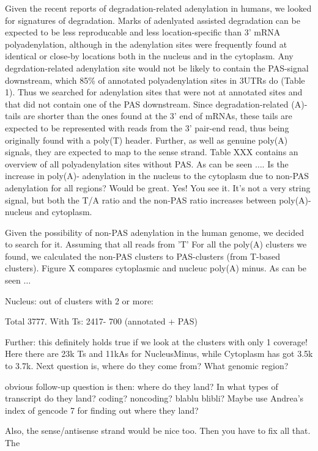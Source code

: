 \documentclass[a4paper]{article}
\begin{document}
Given the recent reports of degradation-related adenylation in humans, we
looked for signatures of degradation. Marks of adenlyated assisted degradation
can be expected to be less reproducable and less location-specific than 3' mRNA
polyadenylation, although in \cite{} the adenylation sites were frequently
found at identical or close-by locations both in the nucleus and in the
cytoplasm. Any degrdation-related adenylation site would not be likely to
contain the PAS-signal downstream, which 85\% of annotated polyadenylation
sites in 3UTRs do (Table 1). Thus we searched for adenylation sites that were
not at annotated sites and that did not contain one of the PAS downstream.
Since degradation-related (A)-tails are shorter than the ones found at the 3'
end of mRNAs, these tails are expected to be represented with reads from the 3'
pair-end read, thus being originally found with a poly(T) header. Further, as
well as genuine poly(A) signals, they are expected to map to the sense strand.
Table XXX contains an overview of all polyadenylation sites without PAS. As can
be seen $\dots$. Is the increase in poly(A)- adenylation in the nucleus to the
cytoplasm due to non-PAS adenylation for all regions? Would be great. Yes! You
see it. It's not a very string signal, but both the T/A ratio and the non-PAS
ratio increases between poly(A)- nucleus and cytoplasm.

Given the possibility of non-PAS adenylation in the human genome, we decided to
search for it. Assuming that all reads from 'T' For all the poly(A) clusters we found, we calculated the non-PAS
clusters to PAS-clusters (from T-based clusters). Figure X compares cytoplasmic
and nucleuc poly(A) minus. As can be seen $\ldots$

Nucleus: out of clusters with 2 or more:

Total 3777. With Ts: 2417- 700 (annotated + PAS)

Further: this definitely holds true if we look at the clusters with only 1
coverage! Here there are 23k Ts and 11kAs for NucleusMinus, while Cytoplasm has
got 3.5k to 3.7k. Next question is, where do they come from? What genomic
region?

obvious follow-up question is then: where do they land? In what types of
transcript do they land? coding? noncoding? blablu blibli? Maybe use Andrea's
index of gencode 7 for finding out where they land?

Also, the sense/antisense strand would be nice too. Then you have to fix all
that.
The

%
\end{document}

